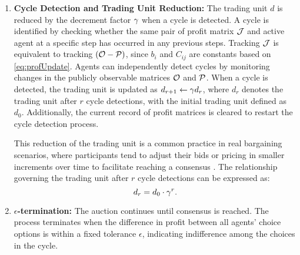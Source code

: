 \begin{enumerate}[\hspace{1pt}1)]
    \item \label{sec:reductionRule} \textbf{Cycle Detection and Trading Unit Reduction:} The trading unit $d$ is reduced by the decrement factor $\gamma$ when a cycle is detected. A cycle is identified by checking whether the same pair of profit matrix $\mathcal{J}$ and active agent at a specific step has occurred in any previous steps. Tracking $\mathcal{J}$ is equivalent to tracking $(\mathcal{O} - \mathcal{P})$, since $b_i$ and $C_{ij}$ are constants based on \cref{eq:profUpdate}. Agents can independently detect cycles by monitoring changes in the publicly observable matrices $\mathcal{O}$ and $\mathcal{P}$. When a cycle is detected, the trading unit is updated as $d_{r+1} \gets \gamma d_r$, where $d_r$ denotes the trading unit after $r$ cycle detections, with the initial trading unit defined as $d_0$. Additionally, the current record of profit matrices is cleared to restart the cycle detection process.
    
    \quad This reduction of the trading unit is a common practice in real bargaining scenarios, where participants tend to adjust their bids or pricing in smaller increments over time to facilitate reaching a consensus \cite{kahneman2013prospect}. The relationship governing the trading unit after $r$ cycle detections can be expressed as:
    \begin{equation}\label{eq:dr}
        d_r = d_0 \cdot \gamma^r.
    \end{equation}
    
    \item \textbf{$\epsilon$-termination:} The auction continues until consensus is reached. The process terminates when the difference in profit between all agents' choice options is within a fixed tolerance $\epsilon$, indicating indifference among the choices in the cycle.
\end{enumerate}

